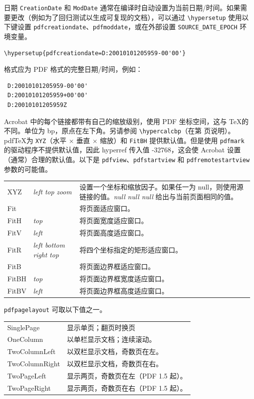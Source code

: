 \documentclass{article}
\newcommand*{\xpackage}[1]{\textsf{#1}}
\begin{document}
日期 \verb|CreationDate| 和 \verb|ModDate| 通常在编译时自动设置为当前日期/时间。如果需要更改（例如为了回归测试以生成可复现的文档），可以通过 \verb|\hypersetup| 使用以下键设置 \verb|pdfcreationdate|、\verb|pdfmoddate|，或在外部设置 \verb|SOURCE_DATE_EPOCH| 环境变量。

\begin{verbatim}
\hypersetup{pdfcreationdate=D:20010101205959-00'00'}
\end{verbatim}

格式应为 PDF 格式的完整日期/时间，例如：
\begin{verbatim}
 D:20010101205959-00'00'
 D:20010101205959+00'00'
 D:20010101205959Z
\end{verbatim}

Acrobat 中的每个链接都带有自己的缩放级别，使用 PDF 坐标空间，这与 \TeX 的不同。单位为 bp，原点在左下角。另请参阅 \verb|\hypercalcbp|（在第 \pageref{hypercalcbp} 页说明）。pdf\TeX 为 \texttt{XYZ}（水平 $\times$ 垂直 $\times$ 缩放）和 \texttt{FitBH} 提供默认值。但是使用 \texttt{pdfmark} 的驱动程序不提供默认值，因此 \xpackage{hyperref} 传入值 -32768，这会使 Acrobat 设置（通常）合理的默认值。以下是 \texttt{pdfview}、\texttt{pdfstartview} 和 \texttt{pdfremotestartview} 参数的可能值。

\begin{longtable}{@{}>{\ttfamily}l>{\itshape}lp{7cm}@{}}
XYZ   & left top zoom         & 设置一个坐标和缩放因子。如果任一为 null，则使用源链接的值。\textit{null null null} 给出与当前页面相同的值。\\
Fit   &                       & 将页面适应窗口。\\
FitH  & top                   & 将页面宽度适应窗口。\\
FitV  & left                  & 将页面高度适应窗口。\\
FitR  & left bottom right top & 将四个坐标指定的矩形适应窗口。\\
FitB  &                       & 将页面边界框适应窗口。\\
FitBH & top                   & 将页面边界框宽度适应窗口。\\
FitBV & left                  & 将页面边界框高度适应窗口。\\
\end{longtable}

\texttt{pdfpagelayout} 可取以下值之一。

\begin{longtable}{@{}>{\ttfamily}lp{10cm}@{}}
SinglePage     & 显示单页；翻页时换页\\
OneColumn      & 以单栏显示文档；连续滚动。\\
TwoColumnLeft  & 以双栏显示文档，奇数页在左。\\
TwoColumnRight & 以双栏显示文档，奇数页在右。\\
TwoPageLeft    & 显示两页，奇数页在左（PDF 1.5 起）。\\
TwoPageRight   & 显示两页，奇数页在右（PDF 1.5 起）。
\end{longtable}
\end{document}

